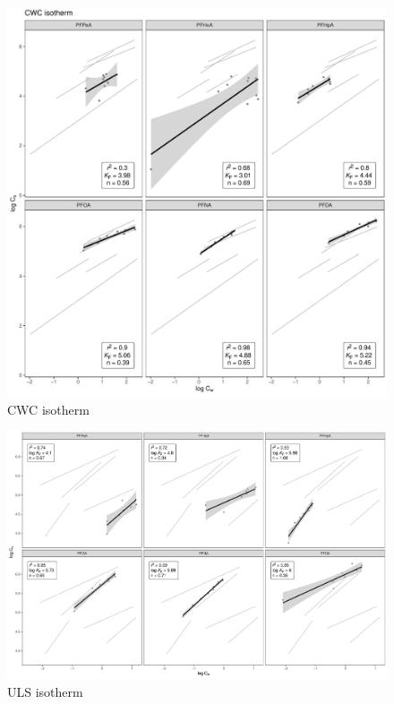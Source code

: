 \begin{figure}
    \centering
    \includegraphics[width=\textwidth]{R/figs/CWC_facet_isotherm.pdf}
    \caption{CWC isotherm}
    \label{CWC_isotherm}
\end{figure}

\begin{figure}
    \centering
    \includegraphics[width=\textwidth]{R/figs/ULS_facet_isotherm.pdf}
    \caption{ULS isotherm}
    \label{ULS_isotherm}
\end{figure}

